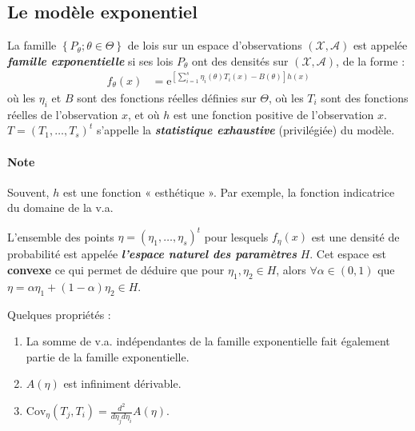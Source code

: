 \documentclass[10pt, french]{report}
\begin{document}
\begin{multicols*}{2}
\subsection{Le modèle exponentiel}
\begin{definitionNOHFILL}
La famille $\left\{P_{\theta}; \theta \in \Theta\right\}$ de lois sur un espace d'observations $(\mathcal{X}, \mathcal{A})$ est appelée \textit{\textbf{famille exponentielle}} si ses lois $P_{\theta}$ ont des densités sur $(\mathcal{X}, \mathcal{A})$, de la forme :
\begin{align*}
	f_{\theta}(x)
	&=	\textrm{e}^{\left[\sum_{i = 1}^{s} \eta_{i}(\theta) T_{i}(x) - B(\theta)\right] h(x)}
\end{align*}
où les $\eta_{i}$ et $B$ sont des fonctions réelles définies sur $\Theta$, où les $T_{i}$ sont des fonctions réelles de l'observation $x$, et où $h$ est une fonction positive de l'observation $x$. $T = (T_{1}, \dots, T_{s})^{t}$ s'appelle la \textbf{\textit{statistique exhaustive}} (privilégiée) du modèle. 

\paragraph{Note}	Souvent, $h$ est une fonction « esthétique ». Par exemple, la fonction indicatrice du domaine de la v.a.
\end{definitionNOHFILL}


L'ensemble des points $\eta = (\eta_{1}, \dots, \eta_{s})^{t}$ pour lesquels $f_{\eta}(x)$ est une densité de probabilité est appelée \textbf{\textit{l'espace naturel des paramètres}} $H$. Cet espace est \textbf{convexe} ce qui permet de déduire que pour $\eta_{1}, \eta_{2} \in H$, alors $\forall \alpha \in (0, 1)$ que $\eta = \alpha \eta_{1} + (1 - \alpha)\eta_{2} \in H$. 

\bigskip

Quelques propriétés : 
\begin{enumerate}
	\item	La somme de v.a. indépendantes de la famille exponentielle fait également partie de la famille exponentielle.
	\item	$A(\eta)$ est infiniment dérivable.
	\item	$\text{Cov}_{\eta}(T_{j}, T_{i}) = \frac{d^{2}}{d \eta_{j} d \eta_{i}} A(\eta)$.
\end{enumerate}



\columnbreak

\end{multicols*}
\end{document}
